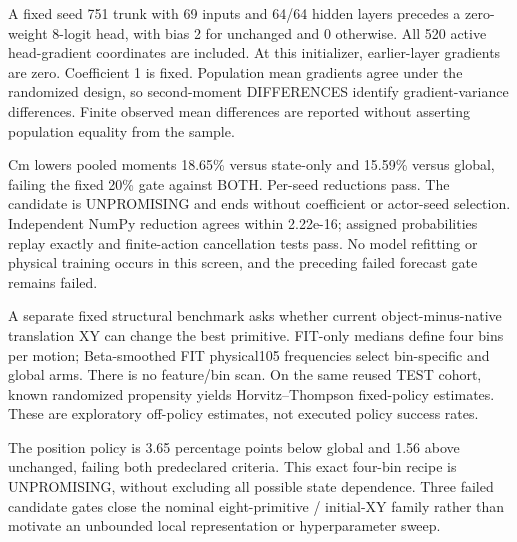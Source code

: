 \documentclass[10 pt]{article}
\begin{document}
A fixed seed 751 trunk with 69 inputs and 64/64 hidden layers precedes a zero-weight
8-logit head, with bias 2 for unchanged and 0 otherwise. All 520 active head-gradient
coordinates are included. At this initializer, earlier-layer gradients are zero.
Coefficient 1 is fixed. Population mean gradients agree under the randomized design,
so second-moment DIFFERENCES identify gradient-variance differences. Finite observed
mean differences are reported without asserting population equality from the sample.

\begin{table}[h]
\centering

\caption{Full-gradient squared-norm means from 1536 reused rows. Absolute second moments are not themselves identified gradient variance or policy utility.}
\end{table}

Cm lowers pooled moments 18.65\% versus state-only and 15.59\% versus global, failing
the fixed 20\% gate against BOTH. Per-seed reductions pass. The candidate is
UNPROMISING and ends without coefficient or actor-seed selection. Independent
NumPy reduction agrees within 2.22e-16; assigned probabilities replay exactly and
finite-action cancellation tests pass. No model refitting or physical training
occurs in this screen, and the preceding failed forecast gate remains failed.

A separate fixed structural benchmark asks whether current object-minus-native
translation XY can change the best primitive. FIT-only medians define four bins
per motion; Beta-smoothed FIT physical105 frequencies select bin-specific and
global arms. There is no feature/bin scan. On the same reused TEST cohort,
known randomized propensity yields Horvitz--Thompson fixed-policy estimates.
These are exploratory off-policy estimates, not executed policy success rates.

\begin{table}[h]
\centering

\caption{Position-bin headroom screen. All three motions and complete test cohorts retained; reported IPW estimates do not establish executed or learned-policy gains.}
\end{table}

The position policy is 3.65 percentage points below global and 1.56 above unchanged,
failing both predeclared criteria. This exact four-bin recipe is UNPROMISING,
without excluding all possible state dependence. Three failed candidate gates
close the nominal eight-primitive / initial-XY family rather than motivate an
unbounded local representation or hyperparameter sweep.
\end{document}
